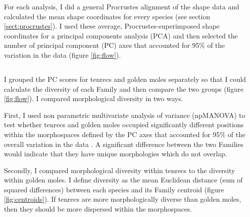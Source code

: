 	For each analysis, I did a general Procrustes alignment of the shape data and calculated the mean shape coordinates for every species (see section \ref{sect:procrustes}). I used these average, Procrustes-superimposed shape coordinates for a principal components analysis (PCA) and then selected the number of principal component (PC) axes that accounted for 95\% of the variation in the data (figure \ref{fig:flow}).
	
\subsection{}
	
	I grouped the PC scores for tenrecs and golden moles separately so that I could calculate the diversity of each Family and then compare the two groups (figure \ref{fig:flow}). I compared morphological diversity in two ways.
	
	First, I used non parametric multivariate analysis of variance (npMANOVA) \citep{Anderson2001} to test whether tenrecs and golden moles occupied significantly different positions within the morphospaces defined by the PC axes that accounted for 95\% of the overall variation in the data \citep[e.g][]{Serb2011, Ruta2013}. A significant difference between the two Families would indicate that they have unique morphologies which do not overlap.
	
	Secondly, I compared morphological diversity within tenrecs to the diversity within golden moles. I define diversity as the mean Euclidean distance (sum of squared differences) between each species and its Family centroid (figure \ref{fig:centroids}). 
	If tenrecs are more morphologically diverse than golden moles, then they should be more dispersed within the morphospaces. 
	
